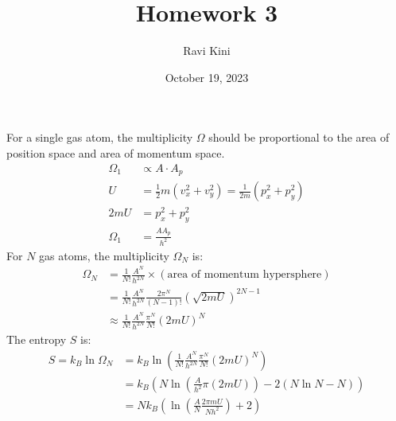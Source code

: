 \documentclass{article}
\title{Homework 3}
\author{Ravi Kini}
\date{October 19, 2023}
\begin{document}
\maketitle

For a single gas atom, the multiplicity $\Omega$ should be proportional to the area of position space and area of momentum space.
\begin{equation}
    \begin{split}
        \Omega_1 & \propto A \cdot A_p \\
        U & = \frac{1}{2}m\left(v_x^2 + v_y^2\right) = \frac{1}{2m}\left(p_x^2 + p_y^2\right) \\
        2mU & = p_x^2 + p_y^2 \\
        \Omega_1 & = \frac{AA_p}{h^2}
    \end{split}
\end{equation}
For $N$ gas atoms, the multiplicity $\Omega_N$ is:
\begin{equation}
    \begin{split}
        \Omega_N & = \frac{1}{N!}\frac{A^N}{h^{2N}} \times \left(\text{area of momentum hypersphere}\right) \\
        & = \frac{1}{N!}\frac{A^N}{h^{2N}} \frac{2\pi^N}{\left(N - 1\right)!}{\left(\sqrt{2mU}\right)}^{2N - 1} \\
        & \approx \frac{1}{N!}\frac{A^N}{h^{2N}} \frac{\pi^N}{N!}{\left(2mU\right)}^N
    \end{split}
\end{equation}
The entropy $S$ is:
\begin{equation}
    \begin{split}
        S = k_B\ln\Omega_N & = k_B\ln\left(\frac{1}{N!}\frac{A^N}{h^{2N}} \frac{\pi^N}{N!}{\left(2mU\right)}^N\right) \\
        & = k_B\left(N\ln\left(\frac{A}{h^{2}} \pi\left(2mU\right)\right) - 2\left(N\ln N - N\right)\right) \\
        & = Nk_B\left(\ln\left(\frac{A}{N}\frac{2\pi mU}{Nh^{2}}\right) + 2\right) \\
    \end{split}
\end{equation}

\clearpage
\end{document}
